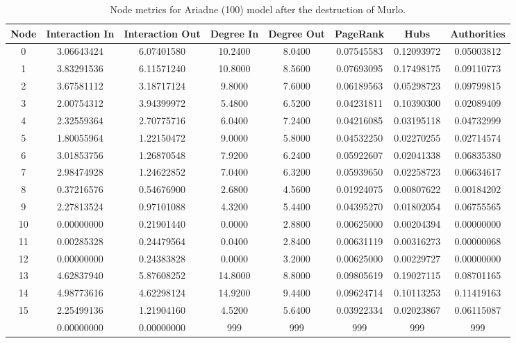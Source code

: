\documentclass[12pt,a4paper]{thesis}
\begin{document}
\begin{table}[H]
\centering
\caption{Node metrics for Ariadne (100) model after the destruction of Murlo.}
\tiny
\begin{tabular}{|c|c|c|c|c|c|c|c|}
\hline	Node	&	Interaction In	&	Interaction Out	&	Degree In	&	Degree Out	&	PageRank	&	Hubs	&	Authorities	\\
\hline	0	&	3.06643424	&	6.07401580	&	10.2400	&	8.0400	&	0.07545583	&	0.12093972	&	0.05003812	\\
\hline	1	&	3.83291536	&	6.11571240	&	10.8000	&	8.5600	&	0.07693095	&	0.17498175	&	0.09110773	\\
\hline	2	&	3.67581112	&	3.18717124	&	9.8000	&	7.6000	&	0.06189563	&	0.05298723	&	0.09799815	\\
\hline	3	&	2.00754312	&	3.94399972	&	5.4800	&	6.5200	&	0.04231811	&	0.10390300	&	0.02089409	\\
\hline	4	&	2.32559364	&	2.70775716	&	6.0400	&	7.2400	&	0.04216085	&	0.03195118	&	0.04732999	\\
\hline	5	&	1.80055964	&	1.22150472	&	9.0000	&	5.8000	&	0.04532250	&	0.02270255	&	0.02714574	\\
\hline	6	&	3.01853756	&	1.26870548	&	7.9200	&	6.2400	&	0.05922607	&	0.02041338	&	0.06835380	\\
\hline	7	&	2.98474928	&	1.24622852	&	7.0400	&	6.3200	&	0.05939650	&	0.02258723	&	0.06634617	\\
\hline	8	&	0.37216576	&	0.54676900	&	2.6800	&	4.5600	&	0.01924075	&	0.00807622	&	0.00184202	\\
\hline	9	&	2.27813524	&	0.97101088	&	4.3200	&	5.4400	&	0.04395270	&	0.01802054	&	0.06755565	\\
\hline	10	&	0.00000000	&	0.21901440	&	0.0000	&	2.8800	&	0.00625000	&	0.00204394	&	0.00000000	\\
\hline	11	&	0.00285328	&	0.24479564	&	0.0400	&	2.8400	&	0.00631119	&	0.00316273	&	0.00000068	\\
\hline	12	&	0.00000000	&	0.24383828	&	0.0000	&	3.2000	&	0.00625000	&	0.00229727	&	0.00000000	\\
\hline	13	&	4.62837940	&	5.87608252	&	14.8000	&	8.8000	&	0.09805619	&	0.19027115	&	0.08701165	\\
\hline	14	&	4.98773616	&	4.62298124	&	14.9200	&	9.4400	&	0.09624714	&	0.10113253	&	0.11419163	\\
\hline	15	&	2.25499136	&	1.21904160	&	4.5200	&	5.6400	&	0.03922334	&	0.02023867	&	0.06115087	\\
\rowcolor{yellow}
\hline	16	&	0.00000000	&	0.00000000	&	999	&	999	&	999	&	999	&	999	\\

\end{tabular}
\end{table}
\end{document}
